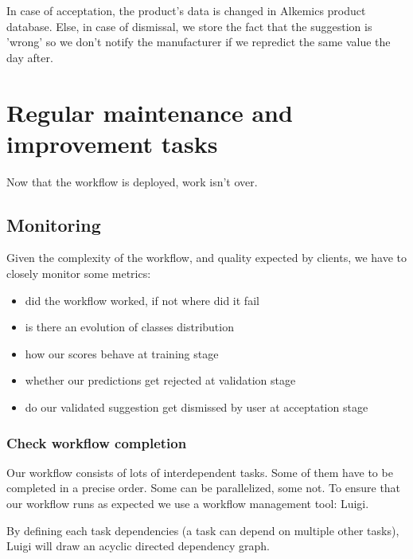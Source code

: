 In case of acceptation, the product's data is changed in Alkemics product database. Else, in case of dismissal, we store the fact that the suggestion is 'wrong' so we don't notify the manufacturer if we repredict the same value the day after.


\pagebreak
\section{Regular maintenance and improvement tasks}

Now that the workflow is deployed, work isn't over.

\subsection{Monitoring}

Given the complexity of the workflow, and quality expected by clients, we have to closely monitor some metrics:
\begin{itemize}
	\item did the workflow worked, if not where did it fail
	\item is there an evolution of classes distribution
	\item how our scores behave at training stage
	\item whether our predictions get rejected at validation stage
	\item do our validated suggestion get dismissed by user at acceptation stage
\end{itemize}

\subsubsection{Check workflow completion}
Our workflow consists of lots of interdependent tasks. Some of them have to be completed in a precise order. Some can be parallelized, some not. To ensure that our workflow runs as expected we use a workflow management tool: Luigi.

By defining each task dependencies (a task can depend on multiple other tasks), Luigi will draw an acyclic directed dependency graph.

